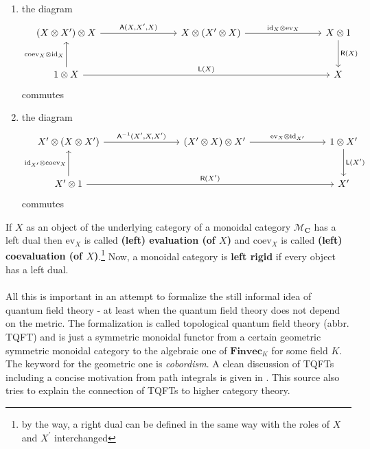 \begin{enumerate}
\item[(LD1)]
the diagram
\[
\begin{tikzcd}[row sep=large,column sep=8em]
  (X \otimes X^{\prime})
  \otimes
  X
  \arrow{r}{\mathsf{A}(X,X^{\prime},X)}
  &
  X
  \otimes
  (X^{\prime} \otimes X)
  \arrow{r}{\mathrm{id}_{X} \otimes \mathrm{ev}_{X}}
  &
  X
  \otimes
  1
  \arrow{d}{\mathsf{R}(X)}
  \\
  1
  \otimes
  X
  \arrow{u}{\mathrm{coev}_{X} \otimes \mathrm{id}_{X}}
  \arrow{rr}{\mathsf{L}(X)}
  &
  &
  X
\end{tikzcd}
\]
commutes
\item[(LD2)]
the diagram
\[
\begin{tikzcd}[row sep=large,column sep=8em]
  X^{\prime}
  \otimes
  (X \otimes X^{\prime})
  \arrow{r}{\mathsf{A}^{-1}(X^{\prime},X,X^{\prime})}
  &
  (X^{\prime} \otimes X)
  \otimes
  X^{\prime}
  \arrow{r}{\mathrm{ev}_{X} \otimes \mathrm{id}_{X^{\prime}}}
  &
  1
  \otimes
  X^{\prime}
  \arrow{d}{\mathsf{L}(X^{\prime})}
  \\
  X^{\prime}
  \otimes
  1
  \arrow{u}{\mathrm{id}_{X^{\prime}} \otimes \mathrm{coev}_{X}}
  \arrow{rr}{\mathsf{R}(X^{\prime})}
  &
  &
  X^{\prime}
\end{tikzcd}
\]
commutes
\end{enumerate}
If $X$ as an object of the underlying category of a monoidal category $\mathcal{M}_{\mathbf{C}}$ has a left dual then $\mathrm{ev}_{X}$ is called \textbf{(left) evaluation (of $X$)} and $\mathrm{coev}_{X}$ is called \textbf{(left) coevaluation (of $X$)}.\footnote{by the way, a right dual can be defined in the same way with the roles of $X$ and $X^{\prime}$ interchanged} Now, a monoidal category is \textbf{left rigid} if every object has a left dual.
\\\\
All this is important in an attempt to formalize the still informal idea of quantum field theory - at least when the quantum field theory does not depend on the metric.
The formalization is called topological quantum field theory (abbr. TQFT) and is just a symmetric monoidal functor from a certain {\glqq}geometric{\grqq} symmetric monoidal category to the {\glqq}algebraic{\grqq} one of $\mathbf{Finvec}_{K}$ for some field $K$.
The keyword for the geometric one is \textit{cobordism}.
A clean discussion of TQFTs including a concise motivation from path integrals is given in \cite{00000011}.
This source also tries to explain the connection of TQFTs to higher category theory.
